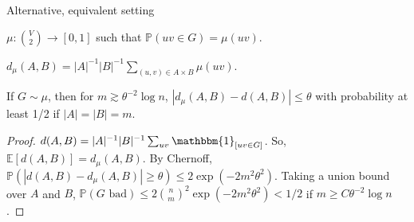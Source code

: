 \documentclass{beamer}
\newcommand{\1}{\mathbbm{1}}
\newcommand{\indicator}[1]{\1_{[#1]}}
\newcommand{\Exp}[1]{\mathbb{E}\left [#1 \right ]}
\newcommand{\Prob}{\mathbb{P}}
\begin{document}
\begin{frame}{Alternative, equivalent setting}
  \begin{definition}
    $\mu: {V \choose 2} \to [0, 1]$ such that $\Prob(uv \in G) = \mu(uv)$.
  \end{definition}

  \pause

  \begin{definition}
    $d_\mu(A, B) = |A|^{-1} |B|^{-1} \sum_{(u, v) \in A \times B} \mu(uv)$.
  \end{definition}

  \pause

  \begin{lemma}
    If $G \sim \mu$, then for $m \gtrsim \theta^{-2} \log n$, $|d_\mu(A, B) - d(A, B)|
      \le \theta$ with probability at least 1/2 if $|A| = |B| = m$.
  \end{lemma}

  \pause

  \begin{proof}
    \pause
    $d(A, B) = |A|^{-1} |B|^{-1} \sum_{uv} \indicator{uv \in G}$.
    \pause
    So, $\Exp{d(A, B)} = d_\mu(A, B)$.
    \pause
    By Chernoff, $\Prob(|d(A, B) - d_\mu(A, B)| \ge \theta) \le 2\exp(-2 m^2 \theta^2)$.
    \pause
    Taking a union bound over $A$ and $B$, $\Prob(G \text{ bad}) \le 2 {n \choose m}^2
      \exp(-2 m^2 \theta^2) < 1/2$ if $m \ge C \theta^{-2} \log n$.
  \end{proof}
\end{frame}
\end{document}
